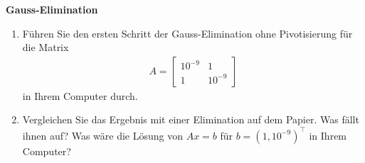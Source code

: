 \textbf{Gauss-Elimination}
\begin{enumerate}
	\item Führen Sie den ersten Schritt der Gauss-Elimination ohne Pivotisierung für die Matrix 
\begin{align*}
	A = \begin{bmatrix}
	10^{-9} & 1 \\
	1 & 10^{-9}
	\end{bmatrix}
\end{align*}
in Ihrem Computer durch. 
\item Vergleichen Sie das Ergebnis mit einer Elimination auf dem Papier. Was fällt ihnen auf? Was wäre die Lösung von $Ax = b$ für
$b = (1, 10^{-9})^\top$ in Ihrem Computer?
\end{enumerate}